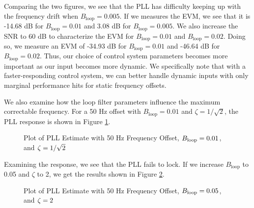 \documentclass{article}
\begin{document}
\noindent Comparing the two figures, we see that the PLL has difficulty keeping up with the frequency drift when $B_\text{loop} = 0.005$. If we measures the EVM, we see that it is -14.68 dB for $B_\text{loop} = 0.01$ and 3.08 dB for $B_\text{loop} = 0.005$. We also increase the SNR to 60 dB to characterize the EVM for $B_\text{loop} = 0.01$ and $B_\text{loop} = 0.02$. Doing so, we measure an EVM of -34.93 dB for $B_\text{loop} = 0.01$ and -46.64 dB for $B_\text{loop} = 0.02$. Thus, our choice of control system parameters becomes more important as our input becomes more dynamic. We specifically note that with a faster-responding control system, we can better handle dynamic inputs with only marginal  performance hits for static frequency offsets.

We also examine how the loop filter parameters influence the maximum correctable frequency. For a 50 Hz offset with $B_{\text{loop}} = 0.01$ and $\zeta = 1/\sqrt{2}$, the PLL response is shown in Figure \ref{fig::convergence_Bloop_0p01_damp_sqrt_2_foff_50}.

\begin{figure}[H]
	\centerline{}
	\caption{Plot of PLL Estimate with 50 Hz Frequency Offset, $\protect{B_\text{loop}} = 0.01$, and $\protect{\zeta = 1/\sqrt{2}}$}
	\label{fig::convergence_Bloop_0p01_damp_sqrt_2_foff_50}
\end{figure}

\noindent Examining the response, we see that the PLL fails to lock. If we increase $B_{\text{loop}}$ to 0.05 and $\zeta$ to 2, we get the results shown in Figure \ref{fig::convergence_Bloop_0p05_damp_2_foff_50}.

\begin{figure}[H]
	\centerline{}
	\caption{Plot of PLL Estimate with 50 Hz Frequency Offset, $\protect{B_\text{loop}} = 0.05$, and $\protect{\zeta = 2}$}
	\label{fig::convergence_Bloop_0p05_damp_2_foff_50}
\end{figure}
\end{document}
